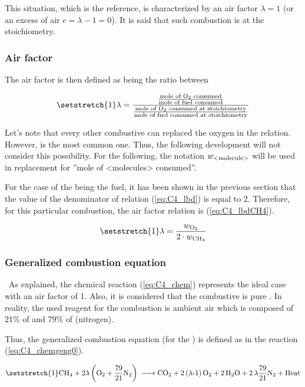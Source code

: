 This situation, which is the reference, is characterized by an air factor \(\lambda = 1\) (or an excess of air \(e=\lambda-1=0\)). It is said that such combustion is at the stoichiometry.

\subsubsection{Air factor}
The air factor is then defined as being the ratio between

\begin{equation}
    \setstretch{1}
    \lambda = \frac{\frac{\text{mole of \ce{O2} consumed}}{\text{mole of fuel consumed}}}{\frac{\text{mole of \ce{O2} consumed at stoichiometry}}{\text{mole of fuel consumed at stoichiometry}}} \label{eq:C4_lbd}
\end{equation}

Let's note that every other combustive can replaced the oxygen in the relation. However,  is the most common one. Thus, the following development will not consider this possibility.
For the following, the notation \(w_{\ce{\text{<molecule>}}}\) will be used in replacement for ''mole of <molecules> consumed''.

For the case of the  being the fuel, it has been shown in the previous section that the value of the denominator of relation (\ref{eq:C4_lbd}) is equal to 2. Therefore, for this particular combustion, the air factor relation is (\ref{eq:C4_lbdCH4}).


\begin{equation}
    \setstretch{1}
    \lambda = \frac{w_{\ce{O2}}}{2\cdot w_{\ce{CH4}}}\label{eq:C4_lbdCH4}
\end{equation}

\subsubsection{Generalized combustion equation}
\quad\ As explained, the chemical reaction (\ref{eq:C4_chem}) represents the ideal case with an air factor of 1. Also, it is considered that the combustive is pure . In reality, the used reagent for the combustion is ambient air which is composed of 21\% of  and 79\% of  (nitrogen).

Thus, the generalized combustion equation (for the ) is defined as in the reaction (\ref{eq:C4_chemgeng0}).

\begin{equation}
    \setstretch{1}
    \ce{CH4 +}2\lambda \left(\ce{O2}+\frac{79}{21}\ce{N2}\right) \ce{-> CO2 + 2(\lambda-1)O2 + 2H2O + 2\lambda\frac{79}{21}N2 + \text{Heat}}\label{eq:C4_chemgeng0}
\end{equation}

